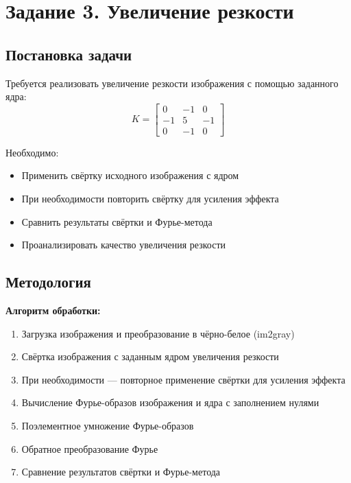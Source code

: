 \section*{Задание 3. Увеличение резкости}

\subsection*{Постановка задачи}

Требуется реализовать увеличение резкости изображения с помощью заданного ядра:
\begin{equation}
K = \begin{bmatrix}
0 & -1 & 0 \\
-1 & 5 & -1 \\
0 & -1 & 0
\end{bmatrix}
\end{equation}

Необходимо:
\begin{itemize}
    \item Применить свёртку исходного изображения с ядром
    \item При необходимости повторить свёртку для усиления эффекта
    \item Сравнить результаты свёртки и Фурье-метода
    \item Проанализировать качество увеличения резкости
\end{itemize}

\subsection*{Методология}

\textbf{Алгоритм обработки:}
\begin{enumerate}
    \item Загрузка изображения и преобразование в чёрно-белое (im2gray)
    \item Свёртка изображения с заданным ядром увеличения резкости
    \item При необходимости — повторное применение свёртки для усиления эффекта
    \item Вычисление Фурье-образов изображения и ядра с заполнением нулями
    \item Поэлементное умножение Фурье-образов
    \item Обратное преобразование Фурье
    \item Сравнение результатов свёртки и Фурье-метода
\end{enumerate}

